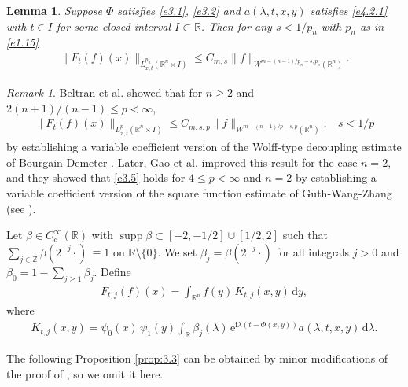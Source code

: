 \documentclass[11pt]{amsproc}
\newcommand{\R}{\mathbb{R}}
\newcommand{\e}{\mathrm{e}}
\newcommand{\supp}{\mathop{\mathrm{supp}}}
\newcommand{\Z}{\mathbb{Z}}
\newcommand{\0}{\mathbf{0}}
\renewcommand{\i}{\mathrm{i}}
\renewcommand{\d}{\mathrm{d}}
\numberwithin{equation}{section}
\numberwithin{figure}{section}
\newtheorem{lem}[thm]{Lemma}
\theoremstyle{definition}
\theoremstyle{remark}
\newtheorem{rk}[thm]{Remark}
\numberwithin{thm}{section}
\begin{document}
\begin{lem}\label{prop:3.1}
Suppose $\Phi$ satisfies \eqref{e3.1}, \eqref{e3.2}   and $a(\lambda,t,x,y)$ satisfies \eqref{e4.2.1} with $t\in I$ for some closed interval $I\subset\R$. Then for any $s<1/p_n$ with $p_n$ as in \eqref{e1.15}
\begin{eqnarray}\label{e3.4}
\|F_t(f)(x)\|_{L^{p_n}_{x,t}(\R^n\times I)}\leq C_{m,s}\|f\|_{W^{m-(n-1)/p_n-s,p_n}(\R^n)}.
\end{eqnarray}
\end{lem}

\smallskip

\begin{rk}   Beltran et al. \cite{BeHiSo} showed that for $n\geq 2$ and $2(n+1)/(n-1)\leq p<\infty$,
\begin{eqnarray}\label{e3.5}
\|F_t(f)(x)\|_{L^p_{x,t}(\R^n\times I)}\leq C_{m,s,p}\|f\|_{W^{m-(n-1)/p-s,p}(\R^n)},\ \ \ \ s<1/p
\end{eqnarray}
by establishing a variable coefficient version of the Wolff-type decoupling estimate of Bourgain-Demeter \cite{BD}. Later,   Gao et al. \cite{GaLiMiXi} improved this result for the case $n=2$, and they showed that \eqref{e3.5} holds for $4\leq p<\infty$ and $n=2$ by establishing   a variable coefficient version of the square function estimate of Guth-Wang-Zhang (see \cite{GWZ}).
\end{rk}




\smallskip
Let $\beta\in C_c^\infty(\R)$ with $\supp\beta\subset [-2,-1/2]\cup [1/2,2]$ such that $\sum_{j\in \Z}\beta(2^{-j}\cdot)\,\equiv 1$ on $\R\setminus\{0\}$. We set $\beta_j=\beta(2^{-j}\cdot)$ for all integrals $j>0$ and $\beta_0=1-\sum_{j\geq 1}\beta_j$. Define
\begin{eqnarray*}
F_{t,j}(f)(x)= \int_{\R^n} f(y)\,K_{t, j}(x,y)\,\d y,
\end{eqnarray*}
where
\begin{eqnarray*}
K_{t, j}(x,y)=\psi_0(x)\, \psi_1(y)  \int_\R \beta_j(\lambda)\,\e^{\i\lambda(t-\Phi(x,y))}a(\lambda,t,x,y)\,\d\lambda.
\end{eqnarray*}

The following  Proposition \ref{prop:3.3} can be obtained by minor modifications of the proof  of \cite[Theorems 6.3.1 and 8.3.1]{So1}, so we omit it here.
\end{document}
